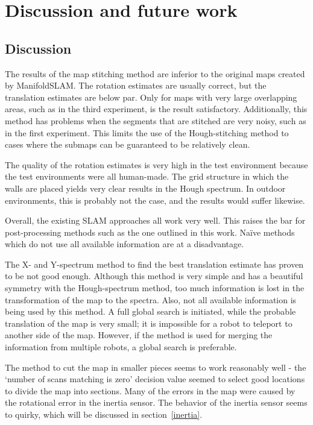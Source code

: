 
\chapter{Discussion and future work}
\label{discussion}

\section{Discussion}
The results of the map stitching method are inferior to the original maps created by ManifoldSLAM. The rotation estimates are usually correct, but the translation estimates are below par. Only for maps with very large overlapping areas, such as in the third experiment, is the result satisfactory. Additionally, this method has problems when the segments that are stitched are very noisy, such as in the first experiment. This limits the use of the Hough-stitching method to cases where the submaps can be guaranteed to be relatively clean.

The quality of the rotation estimates is very high in the test environment because the test environments were all human-made. The grid structure in which the walls are placed yields very clear results in the Hough spectrum. In outdoor environments, this is probably not the case, and the results would suffer likewise.

Overall, the existing SLAM approaches all work very well. This raises the bar for post-processing methods such as the one outlined in this work. Na\"ive methods which do not use all available information are at a disadvantage.

The X- and Y-spectrum method to find the best translation estimate has proven to be not good enough. Although this method is very simple and has a beautiful symmetry with the Hough-spectrum method, too much information is lost in the transformation of the map to the spectra. Also, not all available information is being used by this method. A full global search is initiated, while the probable translation of the map is very small; it is impossible for a robot to teleport to another side of the map. However, if the method is used for merging the information from multiple robots, a global search is preferable. 

The method to cut the map in smaller pieces seems to work reasonably well - the `number of scans matching is zero' decision value seemed to select good locations to divide the map into sections. Many of the errors in the map were caused by the rotational error in the inertia sensor. The behavior of the inertia sensor seems to quirky, which will be discussed in section~\ref{inertia}.

